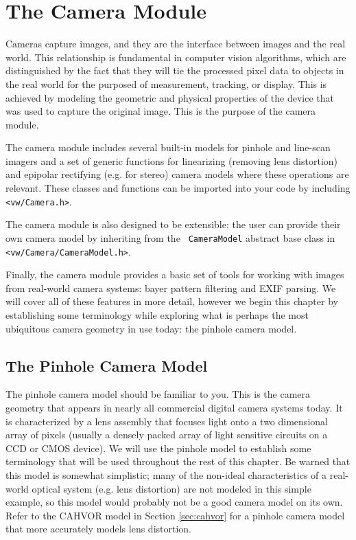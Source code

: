 \chapter{The Camera Module}

Cameras capture images, and they are the interface between images and
the real world.  This relationship is fundamental in computer vision
algorithms, which are distinguished by the fact that they will tie the
processed pixel data to objects in the real world for the purposed of
measurement, tracking, or display.  This is achieved by modeling the
geometric and physical properties of the device that was used to
capture the original image.  This is the purpose of the camera module.

The camera module includes several built-in models for pinhole and
line-scan imagers and a set of generic functions for linearizing
(removing lens distortion) and epipolar rectifying (e.g. for stereo)
camera models where these operations are relevant.  These classes and
functions can be imported into your code by including {\tt
  <vw/Camera.h>}.  

The camera module is also designed to be extensible: the user can
provide their own camera model by inheriting from the {\tt
  CameraModel} abstract base class in {\tt
  <vw/Camera/CameraModel.h>}. 

Finally, the camera module provides a basic set of tools for working
with images from real-world camera systems: bayer pattern filtering
and EXIF parsing.  We will cover all of these features in more detail,
however we begin this chapter by establishing some terminology while
exploring what is perhaps the most ubiquitous camera geometry in use
today: the pinhole camera model.

\section{The Pinhole Camera Model}
The pinhole camera model should be familiar to you.  This is the
camera geometry that appears in nearly all commercial digital camera
systems today.  It is characterized by a lens assembly that focuses
light onto a two dimensional array of pixels (usually a densely packed
array of light sensitive circuits on a CCD or CMOS device).  We will
use the pinhole model to establish some terminology that will be used
throughout the rest of this chapter.  Be warned that this model is
somewhat simplistic; many of the non-ideal characteristics of a
real-world optical system (e.g. lens distortion) are not modeled in
this simple example, so this model would probably not be a good camera
model on its own.  Refer to the CAHVOR model in Section
\ref{sec:cahvor} for a pinhole camera model that more accurately
models lens distortion.

